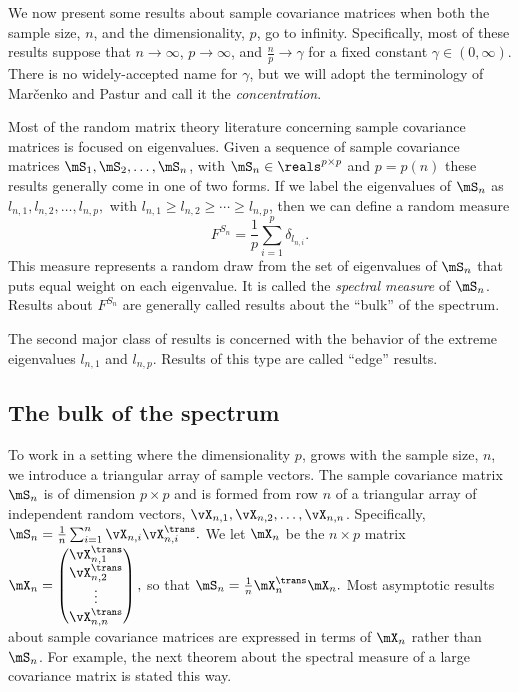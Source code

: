 We now present some results about sample covariance matrices when both the sample size, $n$, and the dimensionality, $p$, go to infinity.  Specifically, most of these results suppose that $n \to \infty$, $p \to \infty$, and 
\(
    \frac{n}{p} \to \gamma
\)
for a fixed constant
\(
    \gamma \in \left( 0, \infty \right).
\)
There is no widely-accepted name for $\gamma$, but we will adopt the terminology of Mar\v{c}enko and Pastur \cite{marcenko1967des} and call it the \emph{concentration}.

Most of the random matrix theory literature concerning sample covariance matrices is focused on eigenvalues.  Given a sequence of sample covariance matrices $\mS_1, \mS_2, \ldots, \mS_n$, with $\mS_n \in \reals^{p\times p}$ and $p = p(n)$ these results generally come in one of two forms.  If we label the eigenvalues of $\mS_n$ as
\(
    l_{n,1}, l_{n,2}, \ldots, l_{n,p},
\)
with $l_{n,1} \geq l_{n,2} \geq \cdots \geq l_{n,p}$, then we can define
a random measure
\[
    F^{S_n} = \frac{1}{p} \sum_{i=1}^p \delta_{l_{n,i}}.
\]
This measure represents a random draw from the set of eigenvalues of $\mS_n$ that puts equal weight on each eigenvalue.  It is called the \emph{spectral measure} of $\mS_n$.  Results about $F^{S_n}$ are generally called results about the ``bulk'' of the spectrum.  

The second major class of results is concerned with the behavior of the
extreme eigenvalues $l_{n,1}$ and $l_{n,p}$. Results of this type are called
``edge'' results.

\subsection{The bulk of the spectrum}

To work in a setting where the dimensionality $p$, grows with the sample size, $n$, we introduce a triangular array of sample vectors.  The sample covariance matrix $\mS_n$ is of dimension $p\times p$ and is formed from row $n$ of a triangular array of independent random vectors,  
$\vX_{n,1}, \vX_{n,2}, \ldots, \vX_{n,n}$.  Specifically,
\(
    \mS_n
    =
    \frac{1}{n}
    \sum_{i=1}^n \vX_{n,i} \vX_{n,i}^\trans.
\)
We let $\mX_n$ be the $n \times p$ matrix
\(
    \mX_n
    =
    \left(
    \begin{matrix}
        \vX_{n,1}^\trans \\
        \vX_{n,2}^\trans \\
        \vdots \\
        \vX_{n,n}^\trans
    \end{matrix}
    \right),
\)
so that 
\(
    \mS_n
    =
    \frac{1}{n}
    \mX_n^\trans \mX_n.
\)
Most asymptotic results about sample covariance matrices are expressed in terms of $\mX_n$ rather than $\mS_n$.  For example, the next theorem about the spectral measure of a large covariance matrix is stated this way.

